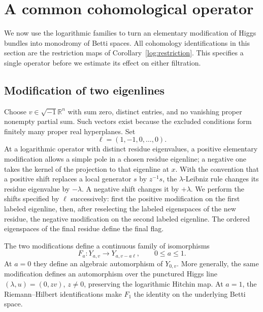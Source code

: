 \section{A common cohomological operator}\label{sec:translation}

We now use the logarithmic families to turn an elementary modification of Higgs bundles into monodromy of Betti spaces. All cohomology identifications in this section are the restriction maps of Corollary~\ref{log:restriction}. This specifies a single operator before we estimate its effect on either filtration.

\subsection{Modification of two eigenlines}

Choose $v\in\sqrt{-1}\mathbb R^n$ with sum zero, distinct entries, and no vanishing proper nonempty partial sum. Such vectors exist because the excluded conditions form finitely many proper real hyperplanes. Set
\[
\ell=(1,-1,0,\ldots,0).
\]
At a logarithmic operator with distinct residue eigenvalues, a positive
elementary modification allows a simple pole in a chosen residue eigenline;
a negative one takes the kernel of the projection to that eigenline at $x$.
With the convention that a positive shift replaces a local generator $s$
by $z^{-1}s$, the $\lambda$-Leibniz rule changes its residue eigenvalue by
$-\lambda$. A negative shift changes it by $+\lambda$.
We perform the shifts specified by $\ell$ successively: first the positive
modification on the first labeled eigenline, then, after reselecting the
labeled eigenspaces of the new residue, the negative modification on the
second labeled eigenline. The ordered eigenspaces of the final residue
define the final flag.

\begin{lemma}\label{trans:translation}
The two modifications define a continuous family of isomorphisms
\begin{equation}\label{trans:path}
F_a:Y_{a,v}\longrightarrow Y_{a,v-a\ell},\qquad 0\le a\le1.
\end{equation}
At $a=0$ they define an algebraic automorphism of $Y_{0,v}$. More generally, the same modification defines an automorphism over the punctured Higgs line $(\lambda,u)=(0,zv)$, $z\ne0$, preserving the logarithmic Hitchin map. At $a=1$, the Riemann--Hilbert identifications make $F_1$ the identity on the underlying Betti space.
\end{lemma}

